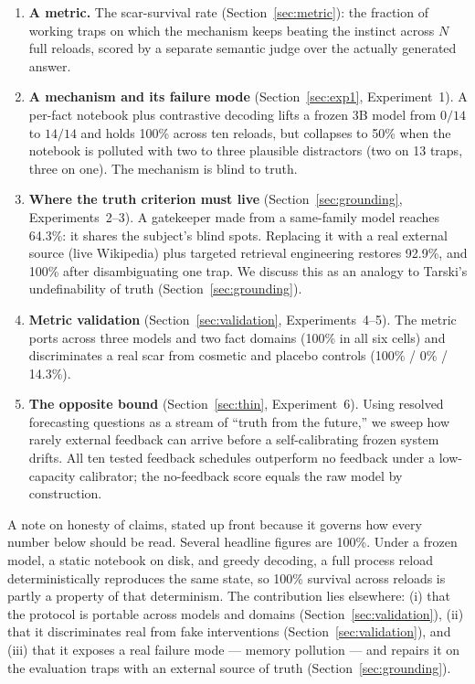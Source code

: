 \documentclass[11pt]{article}
\newcommand{\scar}{scar\nobreakdash-survival rate}
\begin{document}
\begin{enumerate}[leftmargin=1.4em,itemsep=2pt]
\item \textbf{A metric.} The \scar{} (Section~\ref{sec:metric}): the fraction of
working traps on which the mechanism keeps beating the instinct across $N$ full
reloads, scored by a separate semantic judge over the actually generated
answer.

\item \textbf{A mechanism and its failure mode} (Section~\ref{sec:exp1}, Experiment~1). A
per-fact notebook plus contrastive decoding lifts a frozen 3B model from $0/14$
to $14/14$ and holds 100\% across ten reloads, but collapses to 50\% when the
notebook is polluted with two to three plausible distractors (two on 13 traps,
three on one). The mechanism is blind to truth.

\item \textbf{Where the truth criterion must live}
(Section~\ref{sec:grounding}, Experiments~2--3). A gatekeeper made from a same-family model reaches
64.3\%: it shares the subject's blind spots. Replacing it with a real external
source (live Wikipedia) plus targeted retrieval engineering restores 92.9\%, and
100\% after disambiguating one trap. We discuss this as an analogy to Tarski's
undefinability of truth (Section~\ref{sec:grounding}).

\item \textbf{Metric validation} (Section~\ref{sec:validation}, Experiments~4--5). The metric
ports across three models and two fact domains (100\% in all six cells) and
discriminates a real scar from cosmetic and placebo controls (100\% / 0\% /
14.3\%).

\item \textbf{The opposite bound} (Section~\ref{sec:thin}, Experiment~6). Using resolved
forecasting questions as a stream of ``truth from the future,'' we sweep how
rarely external feedback can arrive before a self-calibrating frozen system
drifts. All ten tested feedback schedules outperform no feedback under a
low-capacity calibrator; the no-feedback score equals the raw model by
construction.
\end{enumerate}

A note on honesty of claims, stated up front because it governs how every number
below should be read. Several headline figures are 100\%. Under a frozen model,
a static notebook on disk, and greedy decoding, a full process reload
deterministically reproduces the same state, so 100\% survival across reloads is
partly a property of that determinism. The contribution lies elsewhere:
(i) that the protocol is portable across models and domains
(Section~\ref{sec:validation}), (ii) that it discriminates real from fake
interventions (Section~\ref{sec:validation}), and (iii) that it exposes a real failure mode --- memory pollution --- and
repairs it on the evaluation traps with an external source of
truth (Section~\ref{sec:grounding}).
\end{document}
